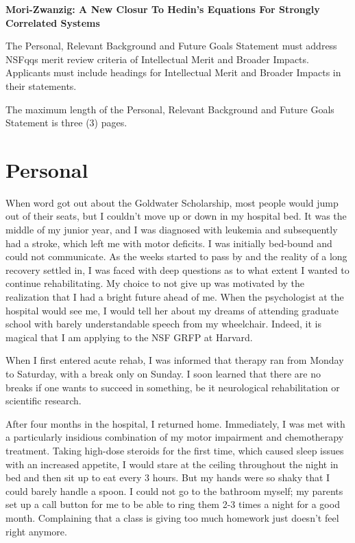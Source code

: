\documentclass[11pt]{article} %
\begin{document}
\begin{center}
\large{\bf Mori-Zwanzig: A New Closur To Hedin's Equations For Strongly Correlated Systems}
\end{center}

The Personal, Relevant Background and Future Goals Statement must address NSFqqs merit review criteria of Intellectual Merit and Broader Impacts. Applicants must include headings for Intellectual Merit and Broader Impacts in their statements.

The maximum length of the Personal, Relevant Background and Future Goals Statement is three (3) pages.
\section{Personal}
When word got out about the Goldwater Scholarship, most people would jump out of their seats, but I couldn't move up or down in my hospital bed. It was the middle of my junior year, and I was diagnosed with leukemia and subsequently had a stroke, which left me with motor deficits. I was initially bed-bound and could not communicate. As the weeks started to pass by and the reality of a long recovery settled in, I was faced with deep questions as to what extent I wanted to continue rehabilitating. My choice to not give up was motivated by the realization that I had a bright future ahead of me. When the psychologist at the hospital would see me, I would tell her about my dreams of attending graduate school with barely understandable speech from my wheelchair. Indeed, it is magical that I am applying to the NSF GRFP at Harvard.

When I first entered acute rehab, I was informed that therapy ran from Monday to Saturday, with a break only on Sunday. I soon learned that there are no breaks if one wants to succeed in something, be it neurological rehabilitation or scientific research.

After four months in the hospital, I returned home. Immediately, I was met with a particularly insidious combination of my motor impairment and chemotherapy treatment. Taking high-dose steroids for the first time, which caused sleep issues with an increased appetite, I would stare at the ceiling throughout the night in bed and then sit up to eat every 3 hours. But my hands were so shaky that I could barely handle a spoon. I could not go to the bathroom myself; my parents set up a call button for me to be able to ring them 2-3 times a night for a good month. Complaining that a class is giving too much homework just doesn't feel right anymore.
\end{document}
